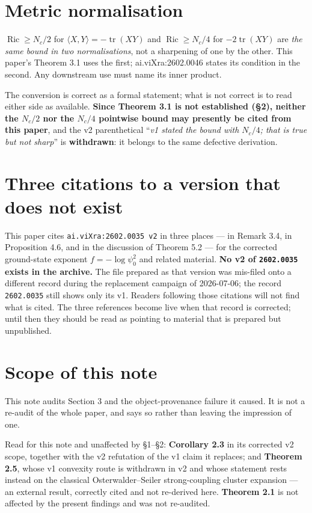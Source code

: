 \documentclass[11pt]{article}
\begin{document}
\section{Metric normalisation}

$\operatorname{Ric}\ge N_c/2$ for $\langle X,Y\rangle=-\operatorname{tr}(XY)$ and
$\operatorname{Ric}\ge N_c/4$ for $-2\operatorname{tr}(XY)$ are \emph{the same bound in
two normalisations}, not a sharpening of one by the other. This paper's Theorem 3.1
uses the first; ai.viXra:2602.0046 states its condition in the second. Any downstream
use must name its inner product.

The conversion is correct as a formal statement; what is not correct is to read either
side as available. \textbf{Since Theorem 3.1 is not established (\S2), neither the
$N_c/2$ nor the $N_c/4$ pointwise bound may presently be cited from this paper}, and
the v2 parenthetical ``\emph{v1 stated the bound with $N_c/4$; that is true but not
sharp}'' is \textbf{withdrawn}: it belongs to the same defective derivation.

\section{Three citations to a version that does not exist}

This paper cites \texttt{ai.viXra:2602.0035 v2} in three places --- in Remark 3.4, in
Proposition 4.6, and in the discussion of Theorem 5.2 --- for the corrected
ground-state exponent $f=-\log\psi_0^2$ and related material. \textbf{No v2 of
\texttt{2602.0035} exists in the archive.} The file prepared as that version was
mis-filed onto a different record during the replacement campaign of 2026-07-06; the
record \texttt{2602.0035} still shows only its v1. Readers following those citations
will not find what is cited. The three references become live when that record is
corrected; until then they should be read as pointing to material that is prepared but
unpublished.

\section{Scope of this note}

This note audits Section 3 and the object-provenance failure it caused. It is not a
re-audit of the whole paper, and says so rather than leaving the impression of one.

Read for this note and unaffected by \S1--\S2: \textbf{Corollary 2.3} in its corrected
v2 scope, together with the v2 refutation of the v1 claim it replaces; and
\textbf{Theorem 2.5}, whose v1 convexity route is withdrawn in v2 and whose statement
rests instead on the classical Osterwalder--Seiler strong-coupling cluster expansion
--- an external result, correctly cited and not re-derived here. \textbf{Theorem 2.1}
is not affected by the present findings and was not re-audited.
\end{document}

